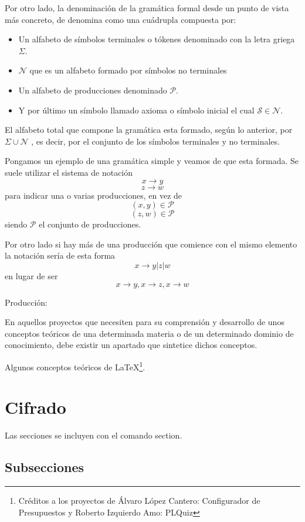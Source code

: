Por otro lado, la denominación de la gramática formal desde un punto de vista más concreto, de denomina como una cuádrupla compuesta por:

\begin{itemize}
	\item Un alfabeto de símbolos terminales o tókenes denominado con la letra griega $\Sigma$.
	\item $\mathcal{N}$ que es un alfabeto formado por símbolos no terminales
	\item Un alfabeto de producciones denominado $\mathcal{P}$.
	\item Y por último un símbolo llamado axioma o símbolo inicial el cual $\mathcal{S} \in \mathcal{N}$.
\end{itemize}

El alfabeto total que compone la gramática esta formado, según lo anterior, por $\Sigma\cup\mathcal{N}$ , es decir, por el conjunto de los símbolos terminales y no terminales.

Pongamos un ejemplo de una gramática simple y veamos de que esta formada. Se suele utilizar el sistema de notación  \[x \rightarrow y\] \[z \rightarrow w\] para indicar una o varias producciones, en vez de \[(x, y) \in \mathcal{P} \] \[(z, w) \in \mathcal{P} \] siendo $\mathcal{P}$ el conjunto de producciones.

Por otro lado si hay más de una producción que comience con el mismo elemento la notación sería de esta forma \[ x \rightarrow y | z | w\] en lugar de ser \[ x \rightarrow y, x \rightarrow z, x \rightarrow w\]


Producción: 

En aquellos proyectos que necesiten para su comprensión y desarrollo de unos conceptos teóricos de una determinada materia o de un determinado dominio de conocimiento, debe existir un apartado que sintetice dichos conceptos.

Algunos conceptos teóricos de \LaTeX \footnote{Créditos a los proyectos de Álvaro López Cantero: Configurador de Presupuestos y Roberto Izquierdo Amo: PLQuiz}.

\section{Cifrado}

Las secciones se incluyen con el comando section.

\subsection{Subsecciones}

